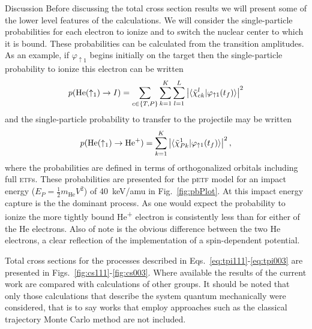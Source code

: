 \documentclass[aps, pra, reprint, groupedaddress, amsfonts, longbibliography,
               amsmath, amssymb, showpacs, nofootinbib]{revtex4-1}
\begin{document}
\begin{section}{Discussion \label{sec:disc}}
   Before discussing the total cross section results we will present some of the lower level features of
   the calculations. We will consider the single-particle probabilities for each electron to ionize and
   to switch the nuclear center to which it is bound. These probabilities can be calculated from the
   transition amplitudes. As an example, if $\varphi_{\uparrow 1}$ begins initially on the target then
   the single-particle probability to ionize this electron can be written
   \begin{equation} \label{eq:ionprob}
      p(\mathrm{He}(\uparrow_1) \rightarrow I ) =
         \sum\limits_{c \in \{T,P\}} \sum\limits_{k=1}^K \sum\limits_{l = 1}^L
         \left| \braket{ \tilde{\chi}^{l}_{c k} | \varphi_{\uparrow 1}(t_f)} \right|^2
   \end{equation}
   and the single-particle probability to transfer to the projectile may be written
   \begin{equation} \label{eq:transprob}
      p(\mathrm{He}(\uparrow_1) \rightarrow \mathrm{He}^+) =
         \sum\limits_{k=1}^K \left| \braket{ \tilde{\chi}^{1}_{P k} | \varphi_{\uparrow 1}(t_f)}
                             \right|^2,
   \end{equation}
   where the probabilities are defined in terms of orthogonalized orbitals including full \textsc{etf}s.
   These probabilities are presented for the p\textsc{etf} model for an impact energy ($E_P =
   \frac{1}{2} m_\textrm{He} V^2$) of 40~keV/amu in Fig.~\ref{fig:pbPlot}. At this impact energy
   capture is the the dominant process. As one would expect the probability to ionize the more tightly
   bound He\textsuperscript{+} electron is consistently less than for either of the He electrons. Also
   of note is the obvious difference between the two He electrons, a clear reflection of the
   implementation of a spin-dependent potential.

   Total cross sections for the processes described in
   Eqs.~\eqref{eq:tpi111}-\eqref{eq:tpi003} are presented in Figs.~\ref{fig:cs111}-\ref{fig:cs003}.
   Where available the results of the current work are compared with calculations of other groups. It
   should be noted that only those calculations that describe the system quantum mechanically were
   considered, that is to say works that employ approaches such as the classical trajectory Monte Carlo
   method are not included.


\end{section}
\end{document}

